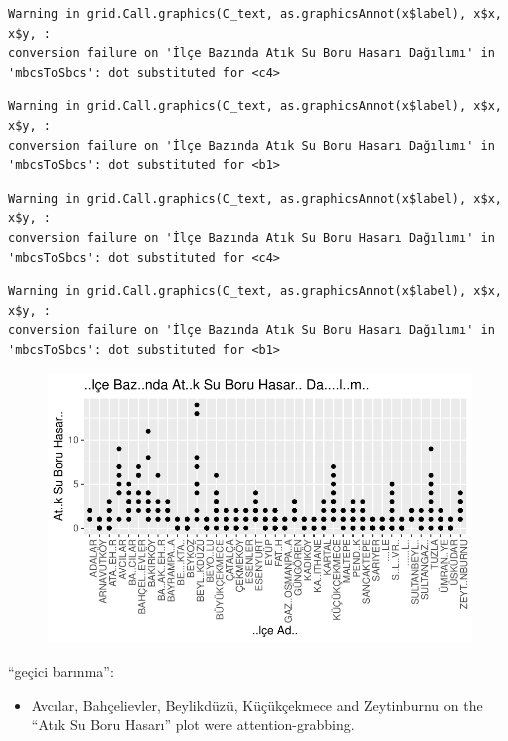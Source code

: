 \documentclass[
  11pt,
  a4paper,
  DIV=11,
  numbers=noendperiod]{scrartcl}
\providecommand{\tightlist}{%
  \setlength{\itemsep}{0pt}\setlength{\parskip}{0pt}}\usepackage{longtable,booktabs,array}
\begin{document}
\begin{verbatim}
Warning in grid.Call.graphics(C_text, as.graphicsAnnot(x$label), x$x, x$y, :
conversion failure on 'İlçe Bazında Atık Su Boru Hasarı Dağılımı' in
'mbcsToSbcs': dot substituted for <c4>
\end{verbatim}

\begin{verbatim}
Warning in grid.Call.graphics(C_text, as.graphicsAnnot(x$label), x$x, x$y, :
conversion failure on 'İlçe Bazında Atık Su Boru Hasarı Dağılımı' in
'mbcsToSbcs': dot substituted for <b1>
\end{verbatim}

\begin{verbatim}
Warning in grid.Call.graphics(C_text, as.graphicsAnnot(x$label), x$x, x$y, :
conversion failure on 'İlçe Bazında Atık Su Boru Hasarı Dağılımı' in
'mbcsToSbcs': dot substituted for <c4>
\end{verbatim}

\begin{verbatim}
Warning in grid.Call.graphics(C_text, as.graphicsAnnot(x$label), x$x, x$y, :
conversion failure on 'İlçe Bazında Atık Su Boru Hasarı Dağılımı' in
'mbcsToSbcs': dot substituted for <b1>
\end{verbatim}

\begin{figure}[H]

{\centering \includegraphics{project_files/figure-pdf/unnamed-chunk-5-3.pdf}

}

\end{figure}

``geçici barınma'':

\begin{itemize}
\tightlist
\item
  Avcılar, Bahçelievler, Beylikdüzü, Küçükçekmece and Zeytinburnu on the
  ``Atık Su Boru Hasarı'' plot were attention-grabbing.
\end{itemize}
\end{document}
